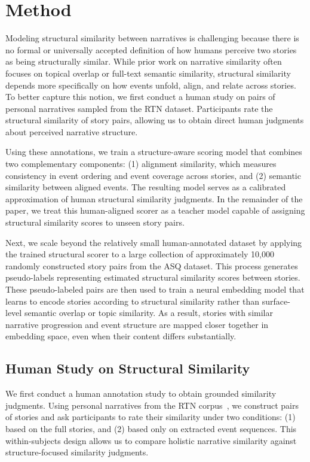 \section{Method}

Modeling structural similarity between narratives is challenging because there is no formal or universally accepted definition of how humans perceive two stories as being structurally similar. While prior work on narrative similarity often focuses on topical overlap or full-text semantic similarity, structural similarity depends more specifically on how events unfold, align, and relate across stories. To better capture this notion, we first conduct a human study on pairs of personal narratives sampled from the RTN dataset. Participants rate the structural similarity of story pairs, allowing us to obtain direct human judgments about perceived narrative structure.

Using these annotations, we train a structure-aware scoring model that combines two complementary components: (1) alignment similarity, which measures consistency in event ordering and event coverage across stories, and (2) semantic similarity between aligned events. The resulting model serves as a calibrated approximation of human structural similarity judgments. In the remainder of the paper, we treat this human-aligned scorer as a teacher model capable of assigning structural similarity scores to unseen story pairs.

Next, we scale beyond the relatively small human-annotated dataset by applying the trained structural scorer to a large collection of approximately 10,000 randomly constructed story pairs from the ASQ dataset. This process generates pseudo-labels representing estimated structural similarity scores between stories. These pseudo-labeled pairs are then used to train a neural embedding model that learns to encode stories according to structural similarity rather than surface-level semantic overlap or topic similarity. As a result, stories with similar narrative progression and event structure are mapped closer together in embedding space, even when their content differs substantially.

\subsection{Human Study on Structural Similarity}

We first conduct a human annotation study to obtain grounded similarity judgments. Using personal narratives from the RTN corpus~\cite{saldias2020exploring}, we construct pairs of stories and ask participants to rate their similarity under two conditions: (1) based on the full stories, and (2) based only on extracted event sequences. This within-subjects design allows us to compare holistic narrative similarity against structure-focused similarity judgments.

